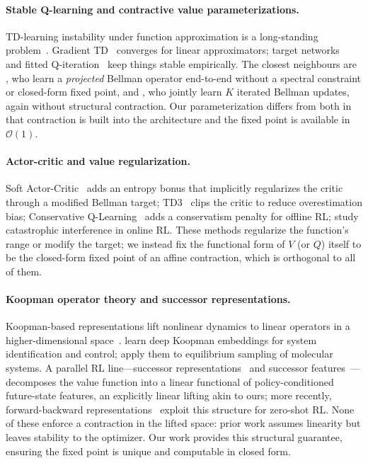 \documentclass{article}
\begin{document}
\paragraph{Stable Q-learning and contractive value parameterizations.}
TD-learning instability under function approximation is a long-standing
problem~\citep{baird1995residual,tsitsiklis1997analysis}.
Gradient TD~\citep{sutton2009fast,maei2010toward} converges for linear
approximators; target networks~\citep{mnih2015human} and fitted
Q-iteration~\citep{ernst2005tree} keep things stable empirically.
The closest neighbours are \citet{vincent2024projected}, who learn a
\emph{projected} Bellman operator end-to-end without a spectral constraint or
closed-form fixed point, and \citet{vincent2025iqn}, who jointly learn $K$
iterated Bellman updates, again without structural contraction.
Our parameterization differs from both in that contraction is built into the
architecture and the fixed point is available in $\mathcal{O}(1)$.

\paragraph{Actor-critic and value regularization.}
Soft Actor-Critic~\citep{haarnoja2018soft} adds an entropy bonus that
implicitly regularizes the critic through a modified Bellman target;
TD3~\citep{fujimoto2018addressing} clips the critic to reduce overestimation
bias; Conservative Q-Learning~\citep{kumar2020conservative} adds a
conservatism penalty for offline RL; \citet{nikishin2022primacy} study
catastrophic interference in online RL.
These methods regularize the function's range or modify the target;
we instead fix the functional form of $V$ (or $Q$) itself to be the closed-form
fixed point of an affine contraction, which is orthogonal to all of them.

\paragraph{Koopman operator theory and successor representations.}
Koopman-based representations lift nonlinear dynamics to linear operators in a
higher-dimensional space~\citep{koopman1931hamiltonian,mezic2005spectral}.
\citet{lusch2018deep} learn deep Koopman embeddings for system identification and
control; \citet{noe2019boltzmann} apply them to equilibrium sampling of molecular
systems.
A parallel RL line---successor representations~\citep{dayan1993successor} and
successor features~\citep{barreto2017successor}---decomposes the value
function into a linear functional of policy-conditioned future-state
features, an explicitly linear lifting akin to ours; more recently,
forward-backward representations~\citep{touati2023fb} exploit this structure
for zero-shot RL.
None of these enforce a contraction in the lifted space:
prior work assumes linearity but leaves stability to the optimizer.
Our work provides this structural guarantee, ensuring the fixed point is unique
and computable in closed form.
\end{document}

